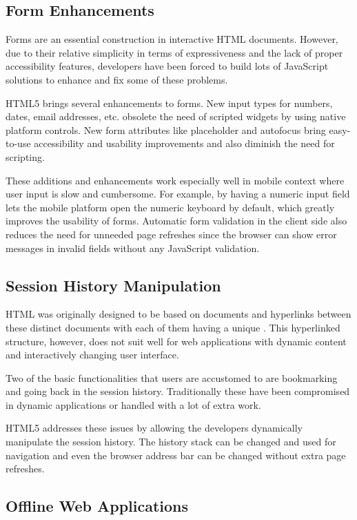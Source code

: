 \subsection{Form Enhancements}

Forms are an essential construction in interactive HTML
documents. However, due to their relative simplicity in terms of
expressiveness and the lack of proper accessibility features,
developers have been forced to build lots of JavaScript solutions to
enhance and fix some of these problems.

HTML5 brings several enhancements to forms. New input types for
numbers, dates, email addresses, etc. obsolete the need of scripted
widgets by using native platform controls. New form attributes like
placeholder and autofocus bring easy-to-use accessibility and
usability improvements and also diminish the need for
scripting. \cite{HTML5draft}

These additions and enhancements work especially well in mobile
context where user input is slow and cumbersome. For example, by
having a numeric input field lets the mobile platform open the numeric
keyboard by default, which greatly improves the usability of
forms. Automatic form validation in the client side also reduces the
need for unneeded page refreshes since the browser can show error
messages in invalid fields without any JavaScript validation.

\subsection{Session History Manipulation}

HTML was originally designed to be based on documents and hyperlinks
between these distinct documents with each of them having a unique
. This hyperlinked structure, however, does not suit well
for web applications with dynamic content and interactively changing
user interface.

Two of the basic functionalities that users are accustomed to are
bookmarking and going back in the session history. Traditionally these
have been compromised in dynamic  applications or handled
with a lot of extra work.

HTML5 addresses these issues by allowing the developers dynamically
manipulate the session history. The history stack can be changed and
used for navigation and even the browser address bar can be changed
without extra page refreshes. \cite{HTML5draft}

\subsection{Offline Web Applications}


